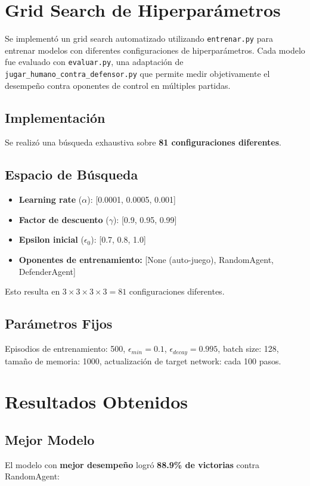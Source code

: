 \documentclass[11pt,a4paper]{article}
\begin{document}
\section{Grid Search de Hiperparámetros}

Se implementó un grid search automatizado utilizando \texttt{entrenar.py} para entrenar modelos con diferentes configuraciones de hiperparámetros. Cada modelo fue evaluado con \texttt{evaluar.py}, una adaptación de \texttt{jugar\_humano\_contra\_defensor.py} que permite medir objetivamente el desempeño contra oponentes de control en múltiples partidas.

\subsection{Implementación}

Se realizó una búsqueda exhaustiva sobre \textbf{81 configuraciones diferentes}.

\subsection{Espacio de Búsqueda}
\begin{itemize}
    \item \textbf{Learning rate} ($\alpha$): [0.0001, 0.0005, 0.001]
    \item \textbf{Factor de descuento} ($\gamma$): [0.9, 0.95, 0.99]
    \item \textbf{Epsilon inicial} ($\epsilon_0$): [0.7, 0.8, 1.0]
    \item \textbf{Oponentes de entrenamiento:} [None (auto-juego), RandomAgent, DefenderAgent]
\end{itemize}

Esto resulta en $3 \times 3 \times 3 \times 3 = 81$ configuraciones diferentes.

\subsection{Parámetros Fijos}
Episodios de entrenamiento: 500, $\epsilon_{min} = 0.1$, $\epsilon_{decay} = 0.995$, batch size: 128, tamaño de memoria: 1000, actualización de target network: cada 100 pasos.

\section{Resultados Obtenidos}

\subsection{Mejor Modelo}
El modelo con \textbf{mejor desempeño} logró \textbf{88.9\% de victorias} contra RandomAgent:
\end{document}

